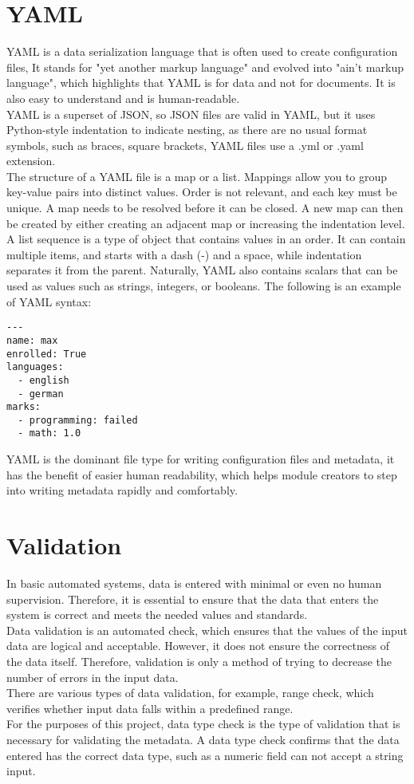 \section{YAML}
YAML is a data serialization language that is often used to create configuration files,
It stands for "yet another markup language" and evolved into "ain’t markup language",  which highlights that YAML is for data and not for documents. It is also easy to understand and is human-readable.\\
YAML is a superset of JSON, so JSON files are valid in YAML, but it uses Python-style indentation to indicate nesting, as there are no usual format symbols, such as braces, square brackets, YAML files use a .yml or .yaml extension.\\
The structure of a YAML file is a map or a list.
Mappings allow you to group key-value pairs into distinct values. Order is not relevant, and each key must be unique. A map needs to be resolved before it can be closed. A new map can then be created by either creating an adjacent map or increasing the indentation level.\\
A list sequence is a type of object that contains values in an order. It can contain multiple items, and starts with a dash (-) and a space, while indentation separates it from the parent.
Naturally, YAML also contains scalars that can be used as values such as strings, integers, or booleans\cite{yaml_redhat}. The following is an example of YAML syntax:

\begin{lstlisting}[caption=YAML example, style=pythonstyle]
---
name: max
enrolled: True
languages:
  - english
  - german
marks:
  - programming: failed
  - math: 1.0

\end{lstlisting}
YAML is the dominant file type for writing configuration files and metadata, it has the benefit of easier human readability, which helps module creators to step into writing metadata rapidly and comfortably.


\section{Validation}
In basic automated systems, data is entered with minimal or even no human supervision. Therefore, it is essential to ensure that the data that enters the system is correct and meets the needed values and standards\cite{BibEntry2021Jul}.\\
Data validation is an automated check, which ensures that the values of the input data are logical and acceptable. However, it does not ensure the correctness of the data itself. Therefore, validation is only a method of trying to decrease the number of errors in the input data.\\
There are various types of data validation, for example, range check, which verifies whether input data falls within a predefined range\cite{BibEntry2021Feb}.\\
For the purposes of this project, data type check is the type of validation that is necessary for validating the metadata. A data type check confirms that the data entered has the correct data type, such as a numeric field can not accept a string input.

